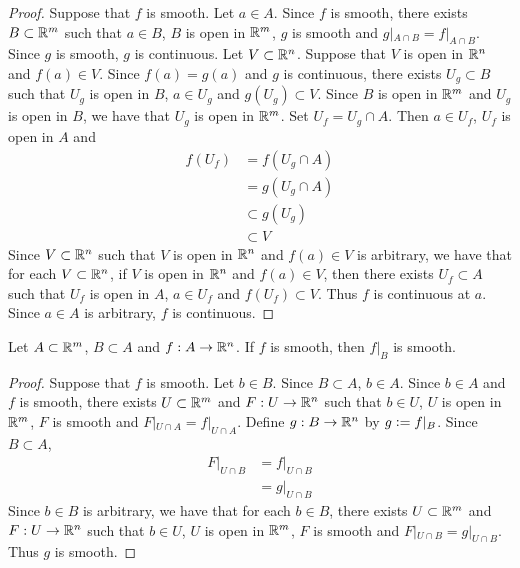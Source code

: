 \documentclass{book}
\begin{document}
	\begin{proof}
		Suppose that $f$ is smooth. Let $a \in A$. Since $f$ is smooth, there exists $B \subset \mathbb{R}^m$ such that $a \in B$, $B$ is open in $\mathbb{R}^m$, $g$ is smooth and $g|_{A \cap B} = f|_{A \cap B}$.
		Since $g$ is smooth, $g$ is continuous. Let $V \subset \mathbb{R}^n$. Suppose that $V$ is open in $\mathbb{R}^n$ and $f(a) \in V$. Since $f(a) = g(a)$ and $g$ is continuous, there exists $U_g \subset B$ such that $U_g$ is open in $B$, $a \in U_g$ and $g(U_g) \subset V$. Since $B$ is open in $\mathbb{R}^m$ and $U_g$ is open in $B$, we have that $U_g$ is open in $\mathbb{R}^m$. Set $U_f = U_g \cap A$. Then $a \in U_f$, $U_f$ is open in $A$ and 
		\begin{align*}
			f(U_f)
			& = f(U_g \cap A) \\
			& = g(U_g \cap A) \\
			& \subset g(U_g) \\
			& \subset V 
		\end{align*}
		Since $V \subset \mathbb{R}^n$ such that $V$ is open in $\mathbb{R}^n$ and $f(a) \in V$ is arbitrary, we have that for each $V \subset \mathbb{R}^n$, if $V$ is open in $\mathbb{R}^n$ and $f(a) \in V$, then there exists $U_f \subset A$ such that $U_f$ is open in $A$, $a \in U_f$ and $f(U_f) \subset V$. Thus $f$ is continuous at $a$. Since $a \in A$ is arbitrary, $f$ is continuous. 
	\end{proof}

	\begin{ex} 
		Let $A \subset \mathbb{R}^m$, $B \subset A$ and $f: A \rightarrow \mathbb{R}^n$. If $f$ is smooth, then $f|_B$ is smooth.
	\end{ex}

	\begin{proof}
		Suppose that $f$ is smooth. Let $b \in B$. Since $B \subset A$, $b \in A$. Since $b \in A$ and $f$ is smooth, there exists $U \subset \mathbb{R}^m$ and $F:U \rightarrow \mathbb{R}^n$ such that $b \in U$, $U$ is open in $\mathbb{R}^m$, $F$ is smooth and $F|_{U \cap A} = f|_{U \cap A}$. Define $g: B \rightarrow \mathbb{R}^n$ by $g \vcentcolon= f|_B$. Since $B \subset A$, 
		\begin{align*}
			F|_{U \cap B} 
			& = f|_{U \cap B} \\
			& = g|_{U \cap B}
		\end{align*} 
		Since $b \in B$ is arbitrary, we have that for each $b \in B$, there exists $U \subset \mathbb{R}^m$ and $F:U \rightarrow \mathbb{R}^n$ such that $b \in U$, $U$ is open in $\mathbb{R}^m$, $F$ is smooth and $F|_{U \cap B} = g|_{U \cap B}$. Thus $g$ is smooth.
	\end{proof}
\end{document}
